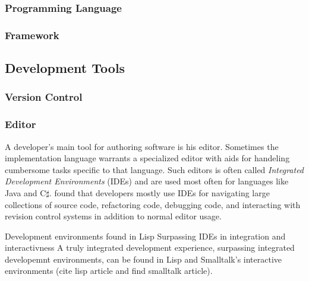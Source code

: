 \subsubsection{Programming Language}

\subsubsection{Framework}

\subsection{Development Tools}

\subsubsection{Version Control}

\subsubsection{Editor}

A developer's main tool for authoring software is his editor. Sometimes the
implementation language warrants a specialized editor with aids for
handeling cumbersome tasks specific to that language. Such editors is often
called \emph{Integrated Development Environments}%
(IDEs) and are used most often for languages like Java and C$\sharp$.
\citet{murphy06} found that developers mostly use IDEs for navigating large
collections of source code, refactoring code, debugging code, and interacting
with revision control systems in addition to normal editor usage.

Development environments found in Lisp%
Surpassing IDEs in integration and interactivness 
A truly integrated development experience, surpassing integrated
developemnt environments, can be found in Lisp and Smalltalk's interactive
environments (cite lisp article and find smalltalk article).

